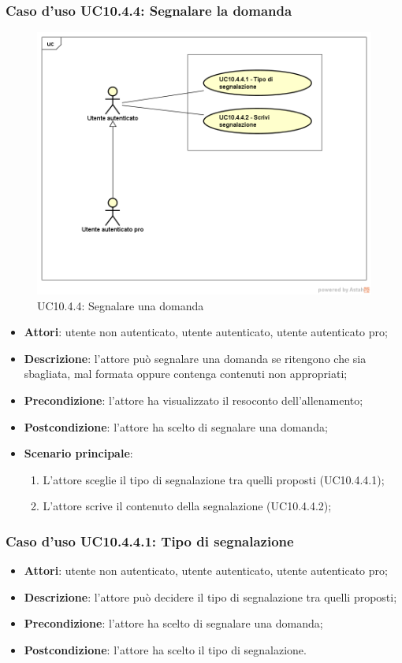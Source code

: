 \subsubsection{Caso d'uso UC10.4.4: Segnalare la domanda}
\label{UC10.4.4}
\begin{figure}
	\centering
	\includegraphics[scale=0.5]{UML/UC10_4_4.png}
	\caption{UC10.4.4: Segnalare una domanda}
\end{figure}
\FloatBarrier
	\begin{itemize}
		\item \textbf{Attori}: utente non autenticato, utente autenticato, utente autenticato pro;
		\item \textbf{Descrizione}: l'attore può segnalare una domanda se ritengono che sia sbagliata, mal formata oppure contenga contenuti non appropriati;
		\item \textbf{Precondizione}: l'attore ha visualizzato il resoconto dell'allenamento;
		\item \textbf{Postcondizione}: l'attore ha scelto di segnalare una domanda;
				\item \textbf{Scenario principale}:
				\begin{enumerate}
					\item L'attore sceglie il tipo di segnalazione tra quelli proposti (UC10.4.4.1);
					\item L'attore scrive il contenuto della segnalazione (UC10.4.4.2);
				\end{enumerate}
	\end{itemize}
\subsubsection{Caso d'uso UC10.4.4.1: Tipo di segnalazione}
	\begin{itemize}
		\item \textbf{Attori}: utente non autenticato, utente autenticato, utente autenticato pro;
		\item \textbf{Descrizione}: l'attore può decidere il tipo di segnalazione tra quelli proposti;
		\item \textbf{Precondizione}: l'attore ha scelto di segnalare una domanda;
		\item \textbf{Postcondizione}: l'attore ha scelto il tipo di segnalazione.
	\end{itemize}
